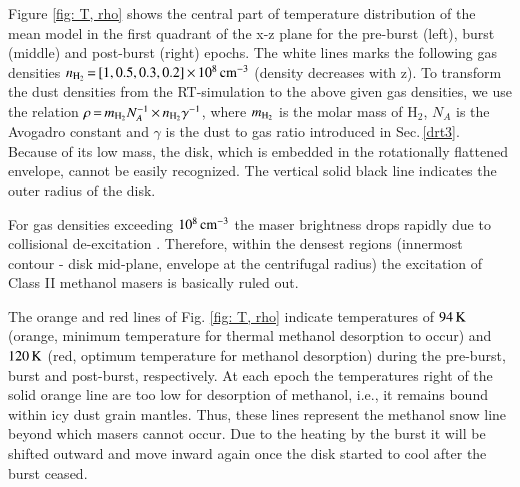 

Figure \ref{fig: T, rho} shows the central part of temperature distribution of the mean model in the first quadrant of the x-z plane for the pre-burst (left), burst (middle) and post-burst (right) epochs. The white lines marks the following gas densities $n_{\rm H_2}\,{=}\,[1, 0.5, 0.3, 0.2]\,{\times}\,10^{8}\,\rm cm^{-3}$ (density decreases with z). To transform the dust densities from the RT-simulation to the above given gas densities, we use the relation $\rho\,{=}\,{m_{\rm H_2}}{N_A^{-1}}\,{\times}\,n_{\rm H_2}\gamma^{-1}$, where $m_{\rm H_2}$ is the molar mass of H$_2$, $N_A$ is the Avogadro constant and $\gamma$ is the dust to gas ratio introduced in Sec.\,\ref{drt3}. Because of its low mass, the disk, which is embedded in the rotationally flattened envelope, cannot be  easily recognized. The vertical solid black line indicates the outer radius of the disk.

For gas densities exceeding $\rm 10^{8}\,cm^{-3}$ the maser brightness drops rapidly
due to collisional de-excitation \citep[Fig. 2,]{2005MNRAS.360..533C}. Therefore, within the densest regions (innermost contour - disk mid-plane, envelope at the centrifugal radius) the excitation of Class II methanol masers is basically ruled out. 

The orange and red lines of Fig. \ref{fig: T, rho} indicate temperatures of $\rm 94\,K$ (orange, minimum temperature for thermal methanol desorption to occur) and $\rm 120\, K$ (red, optimum temperature for methanol desorption) during the pre-burst, burst and post-burst, respectively. At each epoch the temperatures right of the solid orange line are too low for desorption of methanol, i.e., it remains bound within icy dust grain mantles. Thus, these lines represent the methanol snow line beyond which masers cannot occur.
Due to the heating by the burst 
it will be shifted outward
and move inward again once the disk started to cool after the burst ceased.

